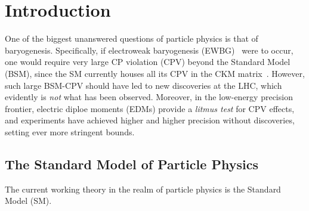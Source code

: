 \chapter{Introduction}
\label{ch:intro}

One of the biggest unanswered questions of particle physics is that of baryogenesis.
Specifically, if electroweak baryogenesis (EWBG)~\cite{EWBG} were to occur, one would require very large CP violation (CPV) beyond the Standard Model (BSM), since the SM currently houses all its CPV in the CKM matrix~\cite{PDG2022}.
However, such large BSM-CPV should have led to new discoveries at the LHC, which evidently is \textit{not} what has been observed.
Moreover, in the low-energy precision frontier, electric diploe moments (EDMs) provide a \textit{litmus test} for CPV effects, and experiments have achieved higher and higher precision without discoveries, setting ever more stringent bounds.

\section{The Standard Model of Particle Physics}
The current working theory in the realm of particle physics is the Standard Model (SM).

